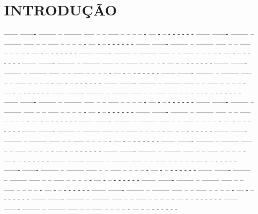 \chapter[INTRODUÇÃO]{INTRODUÇÃO} %
------ ------- -------- --  -------- ----- -- -- ----- -- -- --  -- - --- - -- - - - - - -
------ ------- -------- --  -------- ----- -- -- ----- -- -- --  -- - --- - -- - - - - - -
------ ------- -------- --  -------- ----- -- -- ----- -- -- --  -- - --- - -- - - - - - -
------ ------- -------- --  -------- ----- -- -- ----- -- -- --  -- - --- - -- - - - - - -
------ ------- -------- --  -------- ----- -- -- ----- -- -- --  -- - --- - -- - - - - - -
------ ------- -------- --  -------- ----- -- -- ----- -- -- --  -- - --- - -- - - - - - -
------ ------- -------- --  -------- ----- -- -- ----- -- -- --  -- - --- - -- - - - - - -
------ ------- -------- --  -------- ----- -- -- ----- -- -- --  -- - --- - -- - - - - - -
------ ------- -------- --  -------- ----- -- -- ----- -- -- --  -- - --- - -- - - - - - -
------ ------- -------- --  -------- ----- -- -- ----- -- -- --  -- - --- - -- - - - - - -
------ ------- -------- --  -------- ----- -- -- ----- -- -- --  -- - --- - -- - - - - - -
------ ------- -------- --  -------- ----- -- -- ----- -- -- --  -- - --- - -- - - - - - -
------ ------- -------- --  -------- ----- -- -- ----- -- -- --  -- - --- - -- - - - - - -
------ ------- -------- --  -------- ----- -- -- ----- -- -- --  -- - --- - -- - - - - - -
------ ------- -------- --  -------- ----- -- -- ----- -- -- --  -- - --- - -- - - - - - -
------ ------- -------- --  -------- ----- -- -- ----- -- -- --  -- - --- - -- - - - - - -
------ ------- -------- --  -------- ----- -- -- ----- -- -- --  -- - --- - -- - - - - - -
------ ------- -------- --  -------- ----- -- -- ----- -- -- --  -- - --- - -- - - - - - ------- ------- -------- --  -------- ----- -- -- ----- -- -- --  -- - --- - -- - - - - - -
------ ------- -------- --  -------- ----- -- -- ----- -- -- --  -- - --- - -- - - - - - -
------ ------- -------- --  -------- ----- -- -- ----- -- -- --  -- - --- - -- - - - - - -
------ ------- -------- --  -------- ----- -- -- ----- -- -- --  -- - --- - -- - - - - - -
------ ------- -------- --  -------- ----- -- -- ----- -- -- --  -- - --- - -- - - - - - -
------ ------- -------- --  -------- ----- -- -- ----- -- -- --  -- - --- - -- - - - - - -